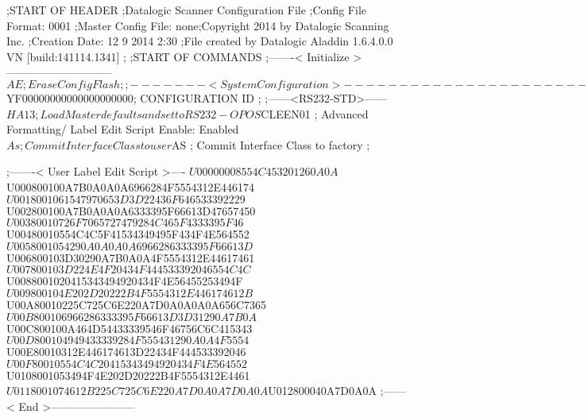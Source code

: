 ;START OF HEADER
;Datalogic Scanner Configuration File
;Config File Format: 0001
;Master Config File: none;Copyright 2014 by Datalogic Scanning Inc.
;Creation Date: 12 9 2014 2:30
;File created by Datalogic Aladdin 1.6.4.0.0 VN [build:141114.1341]
;
;START OF COMMANDS
;-------< Initialize >-----------------------------
$AE                 ; Erase Config Flash
;
;-------< System Configuration >-------------------------------
$YF00000000000000000000; CONFIGURATION ID
;
;------<RS232-STD>------
$HA13               ; Load Master defaults and set to RS232-OPOS
$CLEEN01            ; Advanced Formatting/ Label Edit Script Enable: Enabled
$As                 ; Commit Interface Class to user
$AS                 ; Commit Interface Class to factory
;

;-------< User Label Edit Script >----
$U00000008554C453201260A0A
$U000800100A7B0A0A0A6966284F5554312E446174
$U0018001061547970653D3D22436F646533392229
$U002800100A7B0A0A0A6333395F66613D47657450
$U00380010726F7065727479284C465F4333395F46
$U00480010554C4C5F41534349495F434F4E564552
$U0058001054290A0A0A0A6966286333395F66613D
$U006800103D30290A7B0A0A4F5554312E44617461
$U007800103D224E4F20434F444533392046554C4C
$U0088001020415343494920434F4E56455253494F
$U009800104E202D20222B4F5554312E446174612B
$U00A80010225C725C6E220A7D0A0A0A0A656C7365
$U00B800106966286333395F66613D3D31290A7B0A
$U00C800100A464D54433339546F46756C6C415343
$U00D800104949433339284F555431290A0A4F5554
$U00E80010312E446174613D22434F444533392046
$U00F80010554C4C20415343494920434F4E564552
$U0108001053494F4E202D20222B4F5554312E4461
$U0118001074612B225C725C6E220A7D0A0A7D0A0A
$U012800040A7D0A0A
;------< End >-----------------------
